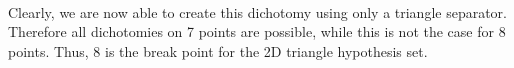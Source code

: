 \documentclass{article}
\begin{document}
\begin{enumerate}
    \\ Clearly, we are now able to create this dichotomy using only a triangle separator. Therefore all dichotomies on 7 points are possible, while this is not the case for 8 points. Thus, 8 is the break point for the 2D triangle hypothesis set.
\end{enumerate}
	
\end{document}
